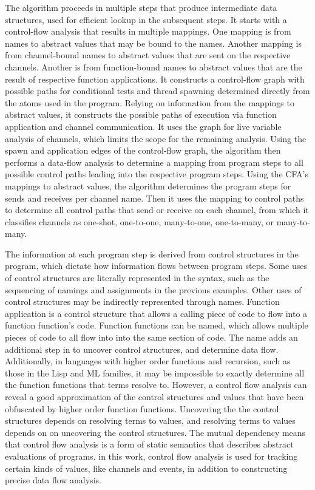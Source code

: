 \documentclass[10pt]{article}
\begin{document}
The algorithm proceeds in multiple steps that produce intermediate data structures, used for
efficient lookup in the subsequent steps.  It starts with a control-flow analysis \cite{} that
results in multiple mappings. One mapping is from names to abstract values that may be bound to
the names. Another mapping is from channel-bound names to abstract values that are
sent on the respective channels. Another is from function-bound names to abstract values
that are the result of respective function applications.  It constructs a control-flow graph 
with possible paths for conditional tests and thread spawning determined directly from the
atoms used in the program.  Relying on information from the mappings to abstract values,
it constructs the possible paths of execution via function application and channel
communication.  It uses the graph for live variable analysis of channels, which limits the
scope for the remaining analysis.  Using the spawn and application edges of the control-flow
graph, the algorithm then performs a data-flow analysis to determine a mapping from program
steps to all possible control paths leading into the respective program steps.  Using the
CFA's mappings to abstract values, the algorithm determines the program steps for sends and
receives per channel name.  Then it uses the mapping to control paths to determine all
control paths that send or receive on each channel, from which it classifies channels as
one-shot, one-to-one, many-to-one, one-to-many, or many-to-many.

The information at each program step is derived from control structures in the program, which
dictate how information flows between program steps. Some uses of control structures are
literally represented in the syntax, such as the sequencing of namings and assignments in the
previous examples. Other uses of control structures may be indirectly represented through
names. Function application is a control structure that allows a calling piece of code to
flow into a function function's code.  Function functions can be named, which allows
multiple pieces of code to all flow into into the same section of code. The name adds an
additional step in to uncover control structures, and determine data flow.
Additionally, in languages with higher order functions and recursion, such as those in the Lisp
and ML families, it may be impossible to exactly determine all the function functions that
terms resolve to. However, a control flow analysis can reveal a good
approximation of the control structures and values that have been obfuscated by higher order
function functions.  Uncovering the the control structures depends on resolving terms
to values, and resolving terms to values depends on on uncovering the control
structures. The mutual dependency means that control flow analysis is a form of
static semantics that describes abstract evaluations of programs. in this work, control flow
analysis is used for tracking certain kinds of values, like channels and events, in addition to
constructing precise data flow analysis. 
\end{document}
